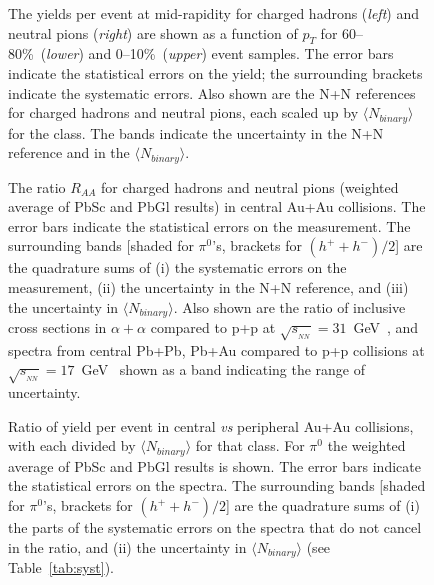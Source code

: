 \begin{multicols}{2}

\vspace{-1cm}
\begin{figure}
\centerline{}
\caption[]{
	The yields per event at mid-rapidity for 
	charged hadrons ({\em left}) and neutral pions ({\em right}) 
	are shown as a function of $p_T$ for 60--80\%~({\it lower}) 
	and 0--10\%~({\it upper}) event samples.
	The error bars indicate the statistical errors on
	the yield; the surrounding brackets indicate the
	systematic errors.  
	Also shown are the N+N references
	for charged hadrons and neutral pions,
	each scaled up by $\langle N_{binary} \rangle$ for the 
	class.  The bands indicate
	the uncertainty in the N+N reference and in the 
	$\langle N_{binary} \rangle$. }
\label{fig:pt_spectra} 
\end{figure} 

\begin{figure}
\centerline{}
\caption[]{
	The ratio $R_{AA}$ for charged hadrons
	and neutral pions (weighted average of PbSc and PbGl
	results) in central Au+Au collisions.
	The error bars indicate the statistical errors on the
	measurement.  The surrounding bands [shaded for
	$\pi^{0}$'s, brackets for $(h^{+}+h^{-})/2$]
	are the quadrature sums of (i) the systematic errors on 
	the measurement, 
	(ii) the uncertainty in the N+N reference,
	and (iii) the uncertainty in $\langle N_{binary} \rangle$.
	Also shown are the ratio of 
	inclusive cross sections in $\alpha+\alpha$
	compared to p+p at $\sqrt{s_{_{NN}}}=31$~GeV~\cite{ISR_alphaalpha}, 
	and spectra from central Pb+Pb, Pb+Au compared to p+p
	collisions at $\sqrt{s_{_{NN}}}=17$~GeV~\cite{predict_nuclear_mod}
	shown as a band indicating the range of uncertainty.
	}
\label{fig:ratio_central_pp} 
\end{figure} 


\begin{figure}
\centerline{}
\caption[]{
	Ratio of yield per event in central {\em vs} 
	peripheral Au+Au collisions, with each divided 
	by $\langle N_{binary} \rangle$ for that class.
	For $\pi^{0}$ the weighted average
	of PbSc and PbGl results is shown.
	The error bars indicate the statistical 
	errors on the spectra.  The surrounding bands 
	[shaded for $\pi^{0}$'s, brackets for 
	$(h^{+}+h^{-})/2$] are the 
	quadrature sums of (i) the parts of the systematic errors on 
	the spectra that do not cancel in the ratio,
	and (ii) the uncertainty in $\langle N_{binary} \rangle$
	(see Table~\ref{tab:syst}).
	}
\label{fig:ratio_central_periph}
\end{figure} 


\end{multicols}
